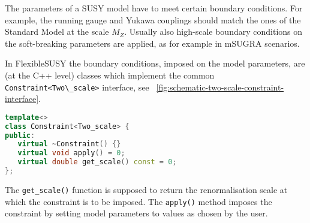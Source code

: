 \documentclass[final,3p,11pt,pdflatex]{elsarticle}
\newcommand{\fs}{FlexibleSUSY\xspace}
\newcommand{\code}[1]{\lstinline|#1|}  %
\newcommand{\figref}[1]{\figurename~\ref{#1}}
\begin{document}
The parameters of a SUSY model have to meet certain boundary
conditions.  For example, the running gauge and Yukawa couplings
should match the ones of the Standard Model at the scale $M_Z$.
Usually also high-scale boundary conditions on the soft-breaking
parameters are applied, as for example in mSUGRA scenarios.

In \fs the boundary conditions, imposed on the model parameters, are
(at the C++ level) classes which implement the common
\code{Constraint<Two\_scale>} interface, see
\figref{fig:schematic-two-scale-constraint-interface}.
%
\begin{lstlisting}[language=C++]
template<>
class Constraint<Two_scale> {
public:
   virtual ~Constraint() {}
   virtual void apply() = 0;
   virtual double get_scale() const = 0;
};
\end{lstlisting}
%
The \code{get_scale()} function is supposed to return the
renormalisation scale at which the constraint is to be imposed.  The
\code{apply()} method imposes the constraint by setting model
parameters to values as chosen by the user.
\end{document}
